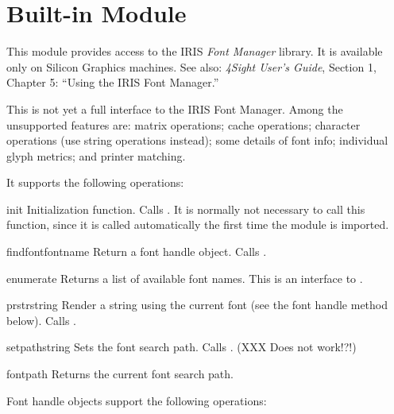 \section{Built-in Module }
\label{module-fm}

This module provides access to the IRIS \emph{Font Manager} library.
It is available only on Silicon Graphics machines.
See also: \emph{4Sight User's Guide}, Section 1, Chapter 5: ``Using
the IRIS Font Manager.''

This is not yet a full interface to the IRIS Font Manager.
Among the unsupported features are: matrix operations; cache
operations; character operations (use string operations instead); some
details of font info; individual glyph metrics; and printer matching.

It supports the following operations:

\begin{funcdesc}{init}{}
Initialization function.
Calls .
It is normally not necessary to call this function, since it is called
automatically the first time the  module is imported.
\end{funcdesc}

\begin{funcdesc}{findfont}{fontname}
Return a font handle object.
Calls .
\end{funcdesc}

\begin{funcdesc}{enumerate}{}
Returns a list of available font names.
This is an interface to .
\end{funcdesc}

\begin{funcdesc}{prstr}{string}
Render a string using the current font (see the  font
handle method below).
Calls .
\end{funcdesc}

\begin{funcdesc}{setpath}{string}
Sets the font search path.
Calls .
(XXX Does not work!?!)
\end{funcdesc}

\begin{funcdesc}{fontpath}{}
Returns the current font search path.
\end{funcdesc}

Font handle objects support the following operations:

